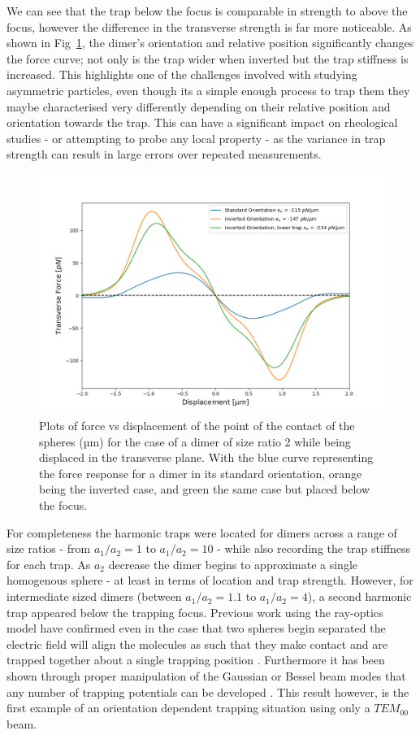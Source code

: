 \documentclass[a4paper,oneside,11pt]{book}
\begin{document}
We can see that the trap below the focus is comparable in strength to above the focus, however the difference in the transverse strength is far more noticeable. As shown in Fig~\ref{fig:transverse_force}, the dimer's orientation and relative position significantly changes the force curve; not only is the trap wider when inverted but the trap stiffness is increased. This highlights one of the challenges involved with studying asymmetric particles, even though its a simple enough process to trap them they maybe characterised very differently depending on their relative position and orientation towards the trap. This can have a significant impact on rheological studies - or attempting to probe any local property - as the variance in trap strength can result in large errors over repeated measurements. 
\begin{figure}
	\centering
	\label{fig:transverse_force}
	\includegraphics[width=0.67\linewidth]{figs/transverse_force.png}


	\caption{Plots of force vs displacement of the point of the contact of the spheres (µm) for the case of a dimer of size ratio 2 while being displaced in the transverse plane. With the blue curve representing the force response for a dimer in its standard orientation, orange being the inverted case, and green the same case but placed below the focus.}
\end{figure}

For completeness the harmonic traps were located for dimers across a range of size ratios - from $a_1/a_2 = 1$ to $a_1/a_2=10$ - while also recording the trap stiffness for each trap. As $a_2$ decrease the dimer begins to approximate a single homogenous sphere - at least in terms of location and trap strength. However, for intermediate sized dimers (between $a_1/a_2 = 1.1$ to $a_1/a_2=4$), a second harmonic trap appeared below the trapping focus. Previous work using the ray-optics model have confirmed even in the case that two spheres begin separated the electric field will align the molecules as such that they make contact and are trapped together about a single trapping position \cite{Xu2005}. Furthermore it has been shown through proper manipulation of the Gaussian or Bessel beam modes that any number of trapping potentials can be developed \cite{Shahabadi2020}. This result however, is the first example of an orientation dependent trapping situation using only a $TEM_00$ beam. 
\end{document}

